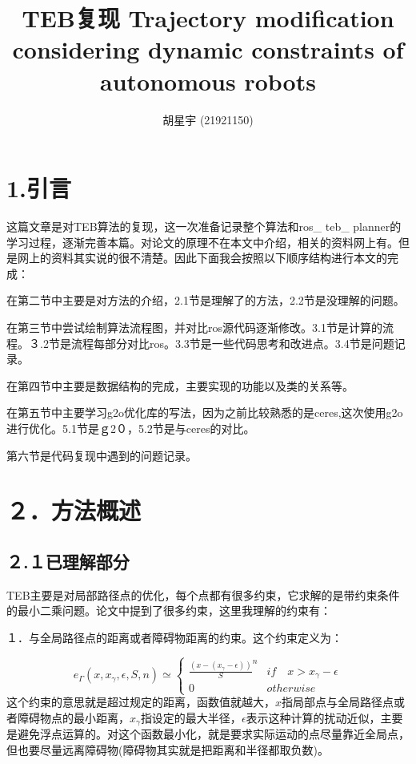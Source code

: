 \documentclass[10pt,a4paper]{article}
\theoremstyle{mythm}
\numberwithin{equation}{section}
\begin{document}
\setlength{\abovedisplayskip}{1ex}
\setlength{\belowdisplayskip}{1ex}

\author{胡星宇 (21921150)}    
\title{TEB复现 
Trajectory modification considering dynamic constraints
of autonomous robots}           
\maketitle                                          
\section{1.引言}
这篇文章是对TEB算法的复现，这一次准备记录整个算法和ros\_ teb\_ planner的学习过程，逐渐完善本篇。对论文的原理不在本文中介绍，相关的资料网上有。但是网上的资料其实说的很不清楚。因此下面我会按照以下顺序结构进行本文的完成：

在第二节中主要是对方法的介绍，2.1节是理解了的方法，2.2节是没理解的问题。

在第三节中尝试绘制算法流程图，并对比ros源代码逐渐修改。3.1节是计算的流程。３.2节是流程每部分对比ros。3.3节是一些代码思考和改进点。3.4节是问题记录。

在第四节中主要是数据结构的完成，主要实现的功能以及类的关系等。

在第五节中主要学习g2o优化库的写法，因为之前比较熟悉的是ceres,这次使用g2o进行优化。5.1节是ｇ2０，5.2节是与ceres的对比。

第六节是代码复现中遇到的问题记录。
\section{２．方法概述}
\subsection{２.１已理解部分}
TEB主要是对局部路径点的优化，每个点都有很多约束，它求解的是带约束条件的最小二乘问题。论文中提到了很多约束，这里我理解的约束有：

１．与全局路径点的距离或者障碍物距离的约束。这个约束定义为：

\begin{equation}
e_{\Gamma}(x,x_{\gamma},\epsilon,S,n)\simeq
\left\{
             \begin{array}{lr}
             \frac{(x-(x_\gamma - \epsilon))}{S}^n & if \quad x > x_{\gamma} - \epsilon \\
             0 & otherwise  
             \end{array}
\right.
\label{eq:constrain_distance}
\end{equation}
这个约束的意思就是超过规定的距离，函数值就越大，$x$指局部点与全局路径点或者障碍物点的最小距离，$x_{\gamma}$指设定的最大半径，$\epsilon$表示这种计算的扰动近似，主要是避免浮点运算的。对这个函数最小化，就是要求实际运动的点尽量靠近全局点，但也要尽量远离障碍物(障碍物其实就是把距离和半径都取负数)。
\end{document}
